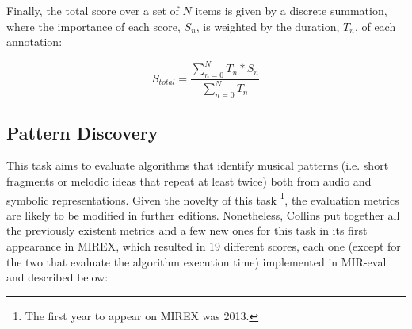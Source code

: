 \documentclass{article}
\begin{document}
Finally, the total score over a set of $N$ items is given by a discrete summation, where the importance of each score, $S_n$, is weighted by the duration, $T_n$, of each annotation:

\begin{equation}
S_{total} = \frac{\sum_{n=0}^{N} T_n*S_n}{\sum_{n=0}^{N} T_n}
\end{equation}
 
\subsection{Pattern Discovery}

This task aims to evaluate algorithms that identify musical patterns (i.e. short fragments or melodic ideas that repeat at least twice) both from audio and symbolic representations.
Given the novelty of this task \footnote{The first year to appear on MIREX was 2013.}, the evaluation metrics are likely to be modified in further editions.
Nonetheless, Collins put together all the previously existent metrics and a few new ones for this task in its first appearance in MIREX\cite{Collins2013}, which resulted in 19 different scores, each one (except for the two that evaluate the algorithm execution time) implemented in MIR-eval and described below:
\end{document}

